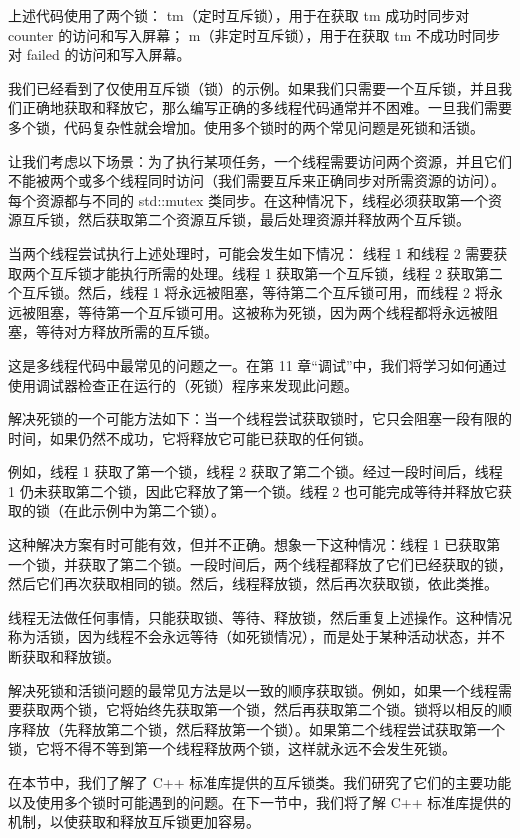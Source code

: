 上述代码使用了两个锁： tm（定时互斥锁），用于在获取 tm 成功时同步对 counter 的访问和写入屏幕； m（非定时互斥锁），用于在获取 tm 不成功时同步对 failed 的访问和写入屏幕。


我们已经看到了仅使用互斥锁（锁）的示例。如果我们只需要一个互斥锁，并且我们正确地获取和释放它，那么编写正确的多线程代码通常并不困难。一旦我们需要多个锁，代码复杂性就会增加。使用多个锁时的两个常见问题是死锁和活锁。


让我们考虑以下场景：为了执行某项任务，一个线程需要访问两个资源，并且它们不能被两个或多个线程同时访问（我们需要互斥来正确同步对所需资源的访问）。每个资源都与不同的 std::mutex 类同步。在这种情况下，线程必须获取第一个资源互斥锁，然后获取第二个资源互斥锁，最后处理资源并释放两个互斥锁。

当两个线程尝试执行上述处理时，可能会发生如下情况： 线程 1 和线程 2 需要获取两个互斥锁才能执行所需的处理。线程 1 获取第一个互斥锁，线程 2 获取第二个互斥锁。然后，线程 1 将永远被阻塞，等待第二个互斥锁可用，而线程 2 将永远被阻塞，等待第一个互斥锁可用。这被称为死锁，因为两个线程都将永远被阻塞，等待对方释放所需的互斥锁。

这是多线程代码中最常见的问题之一。在第 11 章“调试”中，我们将学习如何通过使用调试器检查正在运行的（死锁）程序来发现此问题。


解决死锁的一个可能方法如下：当一个线程尝试获取锁时，它只会阻塞一段有限的时间，如果仍然不成功，它将释放它可能已获取的任何锁。

例如，线程 1 获取了第一个锁，线程 2 获取了第二个锁。经过一段时间后，线程 1 仍未获取第二个锁，因此它释放了第一个锁。线程 2 也可能完成等待并释放它获取的锁（在此示例中为第二个锁）。

这种解决方案有时可能有效，但并不正确。想象一下这种情况：线程 1 已获取第一个锁，并获取了第二个锁。一段时间后，两个线程都释放了它们已经获取的锁，然后它们再次获取相同的锁。然后，线程释放锁，然后再次获取锁，依此类推。

线程无法做任何事情，只能获取锁、等待、释放锁，然后重复上述操作。这种情况称为活锁，因为线程不会永远等待（如死锁情况），而是处于某种活动状态，并不断获取和释放锁。

解决死锁和活锁问题的最常见方法是以一致的顺序获取锁。例如，如果一个线程需要获取两个锁，它将始终先获取第一个锁，然后再获取第二个锁。锁将以相反的顺序释放（先释放第二个锁，然后释放第一个锁）。如果第二个线程尝试获取第一个锁，它将不得不等到第一个线程释放两个锁，这样就永远不会发生死锁。

在本节中，我们了解了 C++ 标准库提供的互斥锁类。我们研究了它们的主要功能以及使用多个锁时可能遇到的问题。在下一节中，我们将了解 C++ 标准库提供的机制，以使获取和释放互斥锁更加容易。






























